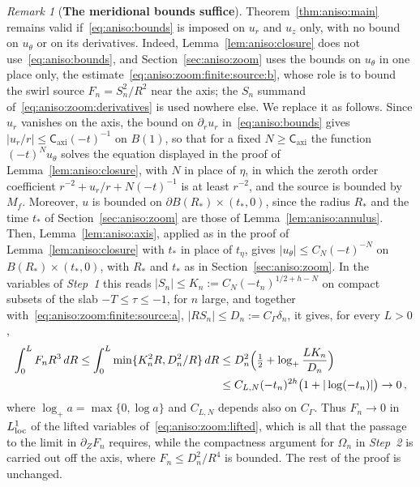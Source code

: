 \documentclass[11pt,reqno]{amsproc}
\numberwithin{equation}{section}
\theoremstyle{remark}
\newtheorem{remark}[theorem]{Remark}
\newcommand{\p}{\partial}
\newcommand{\Caxi}{\mathsf{C}_{\mathrm{axi}}}
\begin{document}
\begin{remark}[{\bf The meridional bounds suffice}]
\label{rem:interior:meridional}
Theorem~\ref{thm:aniso:main} remains valid if~\eqref{eq:aniso:bounds} is imposed on $u_r$ and $u_z$ only, with no bound on $u_\theta$ or on its derivatives. Indeed, Lemma~\ref{lem:aniso:closure} does not use~\eqref{eq:aniso:bounds}, and Section~\ref{sec:aniso:zoom} uses the bounds on $u_\theta$ in one place only, the estimate~\eqref{eq:aniso:zoom:finite:source:b}, whose role is to bound the swirl source $F_n=S_n^2/R^2$ near the axis; the $S_n$ summand of~\eqref{eq:aniso:zoom:derivatives} is used nowhere else. We replace it as follows. Since $u_r$ vanishes on the axis, the bound on $\p_ru_r$ in~\eqref{eq:aniso:bounds} gives $|u_r/r|\le\Caxi(-t)^{-1}$ on $B(1)$, so that for a fixed $N\ge\Caxi$ the function $(-t)^Nu_\theta$ solves the equation displayed in the proof of Lemma~\ref{lem:aniso:closure}, with $N$ in place of $\eta$, in which the zeroth order coefficient $r^{-2}+u_r/r+N(-t)^{-1}$ is at least $r^{-2}$, and the source is bounded by $M_f$. Moreover, $u$ is bounded on $\partial B(R_*)\times(t_*,0)$, since the radius $R_*$ and the time $t_*$ of Section~\ref{sec:aniso:zoom} are those of Lemma~\ref{lem:aniso:annulus}. Then, Lemma~\ref{lem:aniso:axis}, applied as in the proof of Lemma~\ref{lem:aniso:closure} with $t_*$ in place of $t_\eta$, gives $|u_\theta|\le C_N(-t)^{-N}$ on $B(R_*)\times(t_*,0)$, with $R_*$ and $t_*$ as in Section~\ref{sec:aniso:zoom}. In the variables of \emph{Step~1} this reads $|S_n|\le K_n:=C_N(-t_n)^{1/2+h-N}$ on compact subsets of the slab $-T\le\tau\le-1$, for $n$ large, and together with~\eqref{eq:aniso:zoom:finite:source:a}, $|RS_n|\le D_n:=C_\Gamma\delta_n$, it gives, for every $L>0$,
\begin{align}
\int_0^LF_nR^3\,dR
\le\int_0^L\min\{K_n^2R,D_n^2/R\}\,dR
&\le D_n^2\Big(\tfrac12+\log_+\frac{LK_n}{D_n}\Big)
\notag\\
&\le C_{L,N}(-t_n)^{2h}\big(1+|\log(-t_n)|\big)
\to 0
\,,
\label{eq:interior:source:lone}
\end{align}
where $\log_+a=\max\{0,\log a\}$ and $C_{L,N}$ depends also on $C_\Gamma$. Thus $F_n\to0$ in $L^1_{\rm loc}$ of the lifted variables of~\eqref{eq:aniso:zoom:lifted}, which is all that the passage to the limit in $\p_ZF_n$ requires, while the compactness argument for $\Omega_n$ in \emph{Step~2} is carried out off the axis, where $F_n\le D_n^2/R^4$ is bounded. The rest of the proof is unchanged.
\end{remark}
\end{document}
